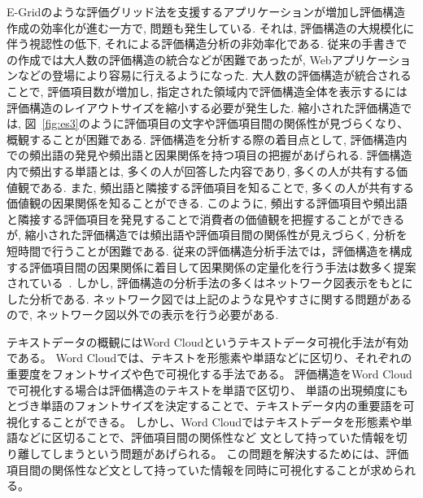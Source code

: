 \documentclass[syuuron]{kuee}
\begin{document}
	E-Gridのような評価グリッド法を支援するアプリケーションが増加し評価構造作成の効率化が進む一方で, 問題も発生している. 
	それは, 評価構造の大規模化に伴う視認性の低下, それによる評価構造分析の非効率化である. 
	従来の手書きでの作成では大人数の評価構造の統合などが困難であったが, Webアプリケーションなどの登場により容易に行えるようになった. 
	大人数の評価構造が統合されることで, 評価項目数が増加し, 指定された領域内で評価構造全体を表示するには評価構造のレイアウトサイズを縮小する必要が発生した.  
	縮小された評価構造では, 図~\ref{fig:es3}のように評価項目の文字や評価項目間の関係性が見づらくなり、概観することが困難である. 
	評価構造を分析する際の着目点として, 評価構造内での頻出語の発見や頻出語と因果関係を持つ項目の把握があげられる. 
	評価構造内で頻出する単語とは, 多くの人が回答した内容であり, 多くの人が共有する価値観である. 
	また, 頻出語と隣接する評価項目を知ることで, 多くの人が共有する価値観の因果関係を知ることができる. 
	このように, 頻出する評価項目や頻出語と隣接する評価項目を発見することで消費者の価値観を把握することができるが, 
	縮小された評価構造では頻出語や評価項目間の関係性が見えづらく, 分析を短時間で行うことが困難である. 
	従来の評価構造分析手法では，評価構造を構成する評価項目間の因果関係に着目して因果関係の定量化を行う手法は数多く提案されている~\cite{egm8, egm9}. 
	しかし, 評価構造の分析手法の多くはネットワーク図表示をもとにした分析である. 
	ネットワーク図では上記のような見やすさに関する問題があるので, ネットワーク図以外での表示を行う必要がある. 
	
	テキストデータの概観にはWord Cloudというテキストデータ可視化手法が有効である。
	Word Cloudでは、テキストを形態素や単語などに区切り、それぞれの重要度をフォントサイズや色で可視化する手法である。
	評価構造をWord Cloudで可視化する場合は評価構造のテキストを単語で区切り、
	単語の出現頻度にもとづき単語のフォントサイズを決定することで、テキストデータ内の重要語を可視化することができる。
	しかし、Word Cloudではテキストデータを形態素や単語などに区切ることで、評価項目間の関係性など
	文として持っていた情報を切り離してしまうという問題があげられる。
	この問題を解決するためには、評価項目間の関係性など文として持っていた情報を同時に可視化することが求められる。
	
\end{document}
